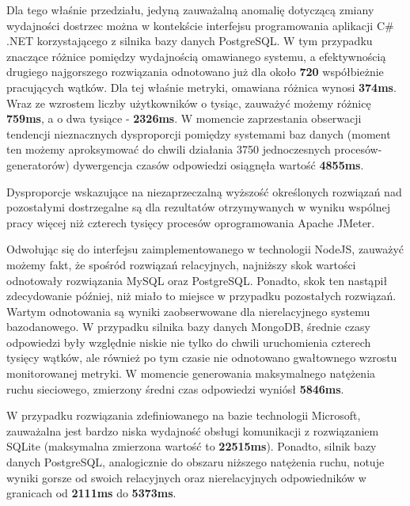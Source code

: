 Dla tego właśnie przedziału, jedyną zauważalną anomalię dotyczącą zmiany wydajności dostrzec można w kontekście interfejsu programowania aplikacji C\# .NET korzystającego z silnika bazy danych PostgreSQL. W tym przypadku znaczące różnice pomiędzy wydajnością omawianego systemu, a efektywnością drugiego najgorszego rozwiązania odnotowano już dla około \textbf{720} współbieżnie pracujących wątków. Dla tej właśnie metryki, omawiana różnica wynosi \textbf{374ms}. Wraz ze wzrostem liczby użytkowników o tysiąc, zauważyć możemy różnicę \textbf{759ms}, a o dwa tysiące - \textbf{2326ms}. W momencie zaprzestania obserwacji tendencji nieznacznych dysproporcji pomiędzy systemami baz danych (moment ten możemy aproksymować do chwili działania 3750 jednoczesnych procesów-generatorów) dywergencja czasów odpowiedzi osiągnęła wartość \textbf{4855ms}.

Dysproporcje wskazujące na niezaprzeczalną wyższość określonych rozwiązań nad pozostałymi dostrzegalne są dla rezultatów otrzymywanych w wyniku wspólnej pracy więcej niż czterech tysięcy procesów oprogramowania Apache JMeter. 

Odwołując się do interfejsu zaimplementowanego w technologii NodeJS, zauważyć możemy fakt, że spośród rozwiązań relacyjnych, najniższy skok wartości odnotowały rozwiązania MySQL oraz PostgreSQL. Ponadto, skok ten nastąpił zdecydowanie później, niż miało to miejsce w przypadku pozostałych rozwiązań. Wartym odnotowania są wyniki zaobserwowane dla nierelacyjnego systemu bazodanowego. W przypadku silnika bazy danych MongoDB, średnie czasy odpowiedzi były względnie niskie nie tylko do chwili uruchomienia czterech tysięcy wątków, ale również po tym czasie nie odnotowano gwałtownego wzrostu monitorowanej metryki. W momencie generowania maksymalnego natężenia ruchu sieciowego, zmierzony średni czas odpowiedzi wyniósł \textbf{5846ms}.

W przypadku rozwiązania zdefiniowanego na bazie technologii Microsoft, zauważalna jest bardzo niska wydajność obsługi komunikacji z rozwiązaniem SQLite (maksymalna zmierzona wartość to \textbf{22515ms}). Ponadto, silnik bazy danych PostgreSQL, analogicznie do obszaru niższego natężenia ruchu, notuje wyniki gorsze od swoich relacyjnych oraz nierelacyjnych odpowiedników w granicach od \textbf{2111ms} do \textbf{5373ms}.


